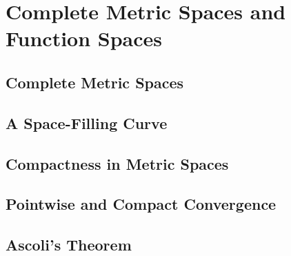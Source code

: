 \chapter{Complete Metric Spaces and Function Spaces}

\section{Complete Metric Spaces}

\section{A Space-Filling Curve}

\section{Compactness in Metric Spaces}

\section{Pointwise and Compact Convergence}

\section{Ascoli's Theorem}
